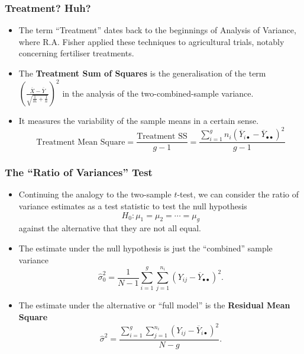 \documentclass[a4paper]{article}\usepackage[]{graphicx}\usepackage[]{xcolor}
\begin{document}
\subsubsection{Treatment? Huh?}
\begin{itemize}
	\item The term ``Treatment'' dates back to the beginnings of Analysis of Variance, where R.A. Fisher applied these techniques to agricultural trials, notably concerning fertiliser treatments.
	\item The \textbf{Treatment Sum of Squares} is the generalisation of the term \( \left(\frac{\overline X-\overline Y}{\sqrt{\frac{1}{m}+\frac{1}{n}}}\right)^2 \) in the analysis of the two-combined-sample variance.
	\item It measures the variability of the sample means in a certain sense.
	\[
		\text{Treatment Mean Square} = \frac{\text{Treatment SS}}{g-1} = \frac{\sum_{i=1}^g n_i (\overline Y_{i\bullet}-\overline Y_{\bullet\bullet})^2}{g-1}
	\]
\end{itemize}
\subsubsection{The ``Ratio of Variances'' Test}
\begin{itemize}
	\item Continuing the analogy to the two-sample \( t \)-test, we can consider the ratio of variance estimates as a test statistic to test the null hypothesis
	\[
		H_0: \mu_1 = \mu_2 = \dotsb = \mu_g
	\]
	against the alternative that they are not all equal.
	\item The estimate under the null hypothesis is just the ``combined'' sample variance
	\[
		\hat{\sigma}^2_0 = \frac{1}{N-1}\sum_{i=1}^g\sum_{j=1}^{n_i}(Y_{ij}-\overline{Y}_{\bullet\bullet})^2.
	\]
	\item The estimate under the alternative or ``full model'' is the \textbf{Residual Mean Square}
	\[
		\hat\sigma^2=\frac{\sum_{i=1}^g\sum_{j=1}^{n_i}(Y_{ij}-\overline{Y}_{i\bullet})^2}{N-g}.
	\]
\end{itemize}
\end{document}
